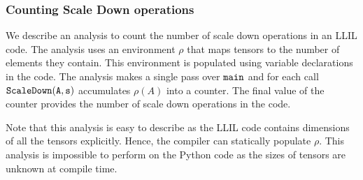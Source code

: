\subsubsection{Counting Scale Down operations}
We describe an analysis to count the number of scale down operations in an LLIL code. The analysis uses an environment $\rho$ that
maps tensors to the number of elements they contain. This
environment is populated using variable declarations in the code.
 The analysis makes a single pass over ${\mathtt{main}}$ and for each call
 ${\mathtt{ScaleDown(A,s)}}$ 
accumulates $\rho(A)$ into a counter. The final value of the counter
provides the number of scale down operations in the code.

Note that this analysis is easy to describe as the LLIL code contains
dimensions of all the tensors explicitly.
Hence, the compiler can statically populate $\rho$. This analysis is
impossible to perform on the \tensorflow Python code 
as the sizes of tensors are unknown at compile time. 










